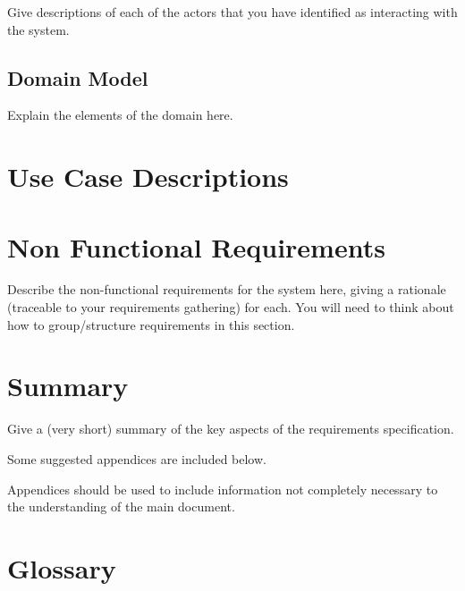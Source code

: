 \documentclass{l3deliverable}
\begin{document}
Give descriptions of each of the actors that you have identified as
interacting with the system.


\subsection{Domain Model}

Explain the elements of the domain here.


\section{Use Case Descriptions}



\section{Non Functional Requirements}

Describe the non-functional requirements for the system here, giving a
rationale (traceable to your requirements gathering) for each.  You
will need to think about how to group/structure requirements in this
section.


\section{Summary}

Give a (very short) summary of the key aspects of the requirements
specification.


\appendix

Some suggested appendices are included below.

Appendices should be used to include information not completely
necessary to the understanding of the main document.

\section{Glossary}
\end{document}
